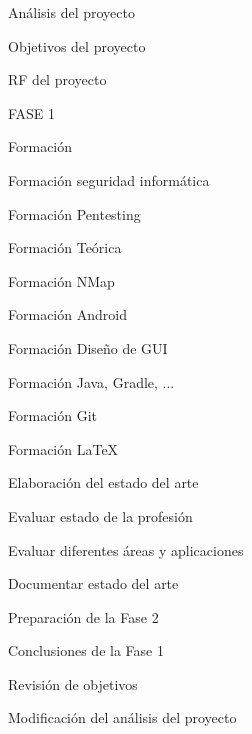 \begin{numbered}
	\setcounter{numberedi}{-1} %
	
	\item Análisis del proyecto
	\begin{numbered}
		\item Objetivos del proyecto
		\item RF del proyecto
	\end{numbered}
	
	\item FASE 1
	\begin{numbered}
		
		\item Formación
		\begin{numbered}
			\item Formación seguridad informática
			\item Formación Pentesting
			\begin{numbered}
				\item Formación Teórica
				\item Formación NMap
			\end{numbered}
			\item Formación Android
			\begin{numbered}
				\item Formación Diseño de GUI
				\item Formación Java, Gradle, ...
			\end{numbered}
			\item Formación Git
			\item Formación \LaTeX
		\end{numbered}
		
		\item Elaboración del estado del arte
		\begin{numbered}
			\item Evaluar estado de la profesión
			\item Evaluar diferentes áreas y aplicaciones
			\item Documentar estado del arte
		\end{numbered}
		
		\item Preparación de la Fase 2
		\begin{numbered}
			\item Conclusiones de la Fase 1
			\item Revisión de objetivos
			\item Modificación del análisis del proyecto
		\end{numbered}
	\end{numbered}
	

\end{numbered}
